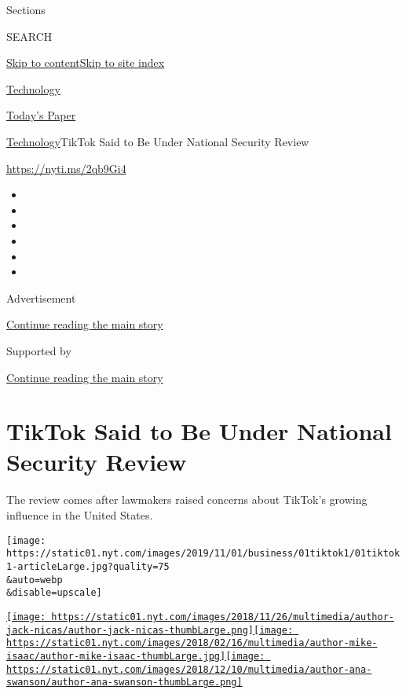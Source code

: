 Sections

SEARCH

\protect\hyperlink{site-content}{Skip to
content}\protect\hyperlink{site-index}{Skip to site index}

\href{https://www.nytimes.com/section/technology}{Technology}

\href{https://myaccount.nytimes.com/auth/login?response_type=cookie\&client_id=vi}{}

\href{https://www.nytimes.com/section/todayspaper}{Today's Paper}

\href{/section/technology}{Technology}\textbar{}TikTok Said to Be Under
National Security Review

\url{https://nyti.ms/2qb9Gi4}

\begin{itemize}
\item
\item
\item
\item
\item
\item
\end{itemize}

Advertisement

\protect\hyperlink{after-top}{Continue reading the main story}

Supported by

\protect\hyperlink{after-sponsor}{Continue reading the main story}

\hypertarget{tiktok-said-to-be-under-national-security-review}{%
\section{TikTok Said to Be Under National Security
Review}\label{tiktok-said-to-be-under-national-security-review}}

The review comes after lawmakers raised concerns about TikTok's growing
influence in the United States.

\texttt{[image: https://static01.nyt.com/images/2019/11/01/business/01tiktok1/01tiktok1-articleLarge.jpg?quality=75\\\&auto=webp\\\&disable=upscale]}

\href{https://www.nytimes.com/by/jack-nicas}{\texttt{[image: https://static01.nyt.com/images/2018/11/26/multimedia/author-jack-nicas/author-jack-nicas-thumbLarge.png]}}\href{https://www.nytimes.com/by/mike-isaac}{\texttt{[image: https://static01.nyt.com/images/2018/02/16/multimedia/author-mike-isaac/author-mike-isaac-thumbLarge.jpg]}}\href{https://www.nytimes.com/by/ana-swanson}{\texttt{[image: https://static01.nyt.com/images/2018/12/10/multimedia/author-ana-swanson/author-ana-swanson-thumbLarge.png]}}

